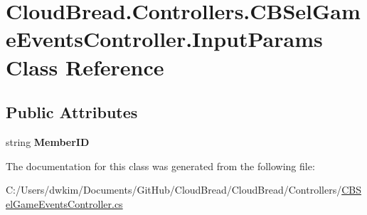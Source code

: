 \hypertarget{a00119}{}\section{Cloud\+Bread.\+Controllers.\+C\+B\+Sel\+Game\+Events\+Controller.\+Input\+Params Class Reference}
\label{a00119}
\subsection*{Public Attributes}
\begin{DoxyCompactItemize}
\item 
string {\bfseries Member\+ID}\hypertarget{a00119_a124f039d1948f24381d448c0df327b8f}{}\label{a00119_a124f039d1948f24381d448c0df327b8f}

\end{DoxyCompactItemize}


The documentation for this class was generated from the following file\+:\begin{DoxyCompactItemize}
\item 
C\+:/\+Users/dwkim/\+Documents/\+Git\+Hub/\+Cloud\+Bread/\+Cloud\+Bread/\+Controllers/\hyperlink{a00217}{C\+B\+Sel\+Game\+Events\+Controller.\+cs}\end{DoxyCompactItemize}
